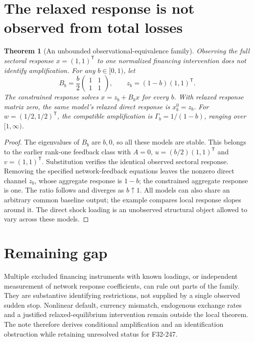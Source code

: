 \documentclass[11pt]{article}
\newtheorem{theorem}{Theorem}
\theoremstyle{definition}
\begin{document}
\section*{The relaxed response is not observed from total losses}
\begin{theorem}[An unbounded observational-equivalence family]
Observing the full sectoral response $x=(1,1)^{\mathsf T}$ to one normalized
financing intervention does not identify amplification. For any $b\in[0,1)$,
let
\[
 B_b=\frac b2\begin{pmatrix}1&1\\1&1\end{pmatrix},\qquad
 z_b=(1-b)(1,1)^{\mathsf T}.
\]
The constrained response solves $x=z_b+B_bx$ for every $b$.
With relaxed response matrix zero, the same model's relaxed direct response
is $x_b^0=z_b$. For $w=(1/2,1/2)^{\mathsf T}$, the compatible amplification
is $\Gamma_b=1/(1-b)$, ranging over $[1,\infty)$.
\end{theorem}
\begin{proof}
The eigenvalues of $B_b$ are $b,0$, so all these models are stable.
This belongs to the earlier rank-one feedback class with $A=0$,
$u=(b/2)(1,1)^{\mathsf T}$ and $v=(1,1)^{\mathsf T}$.
Substitution verifies the identical observed sectoral response.
Removing the specified network-feedback equations leaves the nonzero
direct channel $z_b$, whose aggregate response is $1-b$; the constrained
aggregate response is one. The ratio follows and diverges as $b\uparrow1$.
All models can also share an arbitrary common baseline output; the example
compares local response slopes around it. The direct shock loading is an
unobserved structural object allowed to vary across these models.
\end{proof}

\section*{Remaining gap}
Multiple excluded financing instruments with known loadings, or independent
measurement of network response coefficients, can rule out parts of the
family. They are substantive identifying restrictions, not supplied by a
single observed sudden stop. Nonlinear default, currency mismatch, endogenous
exchange rates and a justified relaxed-equilibrium intervention remain
outside the local theorem. The note therefore derives conditional
amplification and an identification obstruction while retaining unresolved
status for F32-247.
\end{document}
